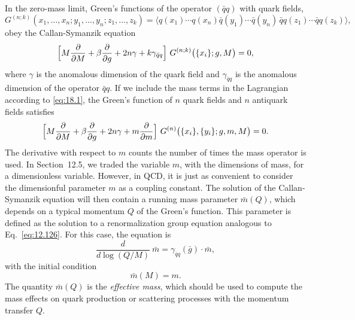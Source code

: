 In the zero-mass limit, Green's functions of the operator $(\bar{q}q)$ with
quark fields,
\begin{equation}
  G^{(n;k)}(x_1, \ldots, x_n; y_1, \ldots, y_n; z_1, \ldots, z_k)
  = \bigl\langle q(x_1)\cdots q(x_n)\bar{q}(y_1)\cdots\bar{q}(y_n)\,
    \bar{q}q(z_1)\cdots\bar{q}q(z_k) \bigr\rangle ,
  \label{eq:18.2}
\end{equation}
obey the Callan-Symanzik equation
\begin{equation}
  \Bigl[ M\frac{\partial}{\partial M} + \beta\frac{\partial}{\partial g}
    + 2n\gamma + k\gamma_{\bar{q}q} \Bigr]\ G^{(n;k)}\bigl( \{x_i\}; g, M
    \bigr) = 0 ,
  \label{eq:18.3}
\end{equation}
where $\gamma$ is the anomalous dimension of the quark field and
$\gamma_{\bar{q}q}$ is the anomalous dimension of the operator
$\bar{q}q$.  If we include the mass terms in the Lagrangian according to
\eqref{eq:18.1}, the Green's function of $n$ quark fields and $n$ antiquark
fields satisfies
\begin{equation}
  \Bigl[ M\frac{\partial}{\partial M} + \beta\frac{\partial}{\partial g}
    + 2n\gamma + m\frac{\partial}{\partial m} \Bigr]\ G^{(n)}\bigl(
      \{x_i\}, \{y_i\}; g, m, M \bigr) = 0 .
  \label{eq:18.4}
\end{equation}
The derivative with respect to $m$ counts the number of times the mass
operator is used.  In Section~12.5, we traded the variable $m$, with the
dimensions of mass, for a dimensionless variable.  However, in QCD, it is
just as convenient to consider the dimensionful parameter $m$ as a coupling
constant.  The solution of the Callan-Symanzik equation will then contain a
running mass parameter $\bar{m}(Q)$, which depends on a typical momentum $Q$
of the Green's function.  This parameter is defined as the solution to a
renormalization group equation analogous to Eq.~\eqref{eq:12.126}.  For this
case, the equation is
\begin{equation}
  \frac{d}{d\log(Q/M)}\ \bar{m} = \gamma_{\bar{q}q}(\bar{g})\cdot\bar{m} ,
  \label{eq:18.5}
\end{equation}
with the initial condition
\begin{equation}
  \bar{m}(M) = m .
  \label{eq:18.6}
\end{equation}
The quantity $\bar{m}(Q)$ is the \emph{effective mass}, which should be used
to compute the mass effects on quark production or scattering processes with
the momentum transfer $Q$.

